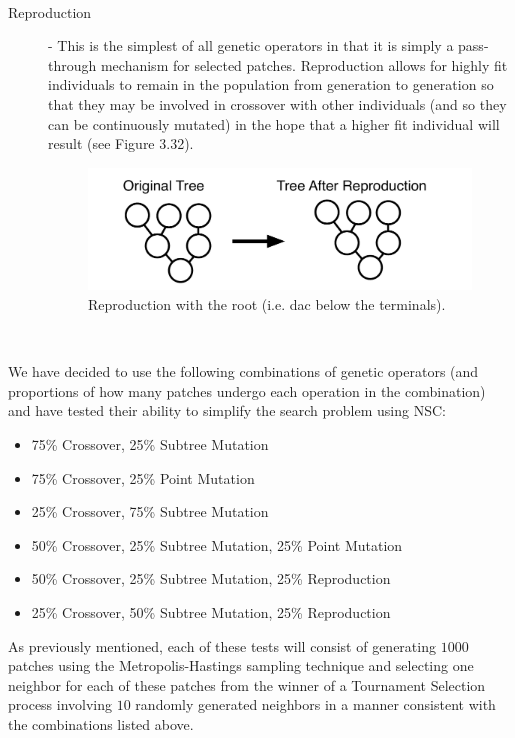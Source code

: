 \documentclass[a4paper,12pt]{report} 	%
\numberwithin{figure}{chapter}
\numberwithin{table}{chapter}
\numberwithin{equation}{chapter}
\begin{document}
\begin{flushleft}
\begin{description}
\begin{figure}[h!]
\begin{center}
\end{center}
\end{figure}
\\
\item[Reproduction] - This is the simplest of all genetic operators in that it is simply a pass-through mechanism for selected patches. Reproduction allows for highly fit individuals to remain in the population from generation to generation so that they may be involved in crossover with other individuals (and so they can be continuously mutated) in the hope that a higher fit individual will result (see Figure 3.32).
\begin{figure}[h!]
\begin{center}
\includegraphics[scale=0.5]{Reproduction}
\caption[Reproduction]{Reproduction with the root (i.e. dac\texttildelow{} below the terminals).}
\end{center}
\end{figure}
\\
\end{description}

We have decided to use the following combinations of genetic operators (and proportions of how many patches undergo each operation in the combination) and have tested their ability to simplify the search problem using NSC:

\begin{itemize}
\item 75\% Crossover, 25\% Subtree Mutation
\item 75\% Crossover, 25\% Point Mutation
\item 25\% Crossover, 75\% Subtree Mutation
\item 50\% Crossover, 25\% Subtree Mutation, 25\% Point Mutation
\item 50\% Crossover, 25\% Subtree Mutation, 25\% Reproduction
\item 25\% Crossover, 50\% Subtree Mutation, 25\% Reproduction
\end{itemize}
As previously mentioned, each of these tests will consist of generating $1000$ patches using the Metropolis-Hastings sampling technique and selecting one neighbor for each of these patches from the winner of a Tournament Selection process involving $10$ randomly generated neighbors in a manner consistent with the combinations listed above.


\end{flushleft}
\end{document}
